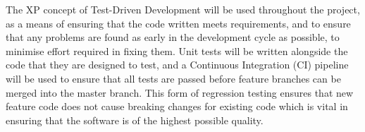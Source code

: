 The XP concept of Test-Driven Development will be used throughout the project, as a means of ensuring that the code written meets requirements, and to ensure that any problems are found as early in the development cycle as possible, to minimise effort required in fixing them. Unit tests will be written alongside the code that they are designed to test, and a Continuous Integration (CI) pipeline will be used to ensure that all tests are passed before feature branches can be merged into the master branch. This form of regression testing ensures that new feature code does not cause breaking changes for existing code which is vital in ensuring that the software is of the highest possible quality.